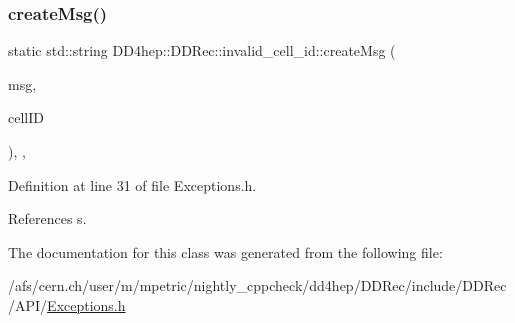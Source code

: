 \subsubsection{\texorpdfstring{create\+Msg()}{createMsg()}}
{\footnotesize\ttfamily static std\+::string D\+D4hep\+::\+D\+D\+Rec\+::invalid\+\_\+cell\+\_\+id\+::create\+Msg (\begin{DoxyParamCaption}\item[{const std\+::string \&}]{msg,  }\item[{const \hyperlink{namespace_d_d4hep_1_1_d_d_segmentation_ac7af071d85cb48820914434a07e21ba1}{D\+D\+Segmentation\+::\+Cell\+ID} \&}]{cell\+ID }\end{DoxyParamCaption})\hspace{0.3cm}{\ttfamily [inline]}, {\ttfamily [static]}, {\ttfamily [private]}}



Definition at line 31 of file Exceptions.\+h.



References s.



The documentation for this class was generated from the following file\+:\begin{DoxyCompactItemize}
\item 
/afs/cern.\+ch/user/m/mpetric/nightly\+\_\+cppcheck/dd4hep/\+D\+D\+Rec/include/\+D\+D\+Rec/\+A\+P\+I/\hyperlink{_d_d_rec_2include_2_d_d_rec_2_a_p_i_2_exceptions_8h}{Exceptions.\+h}\end{DoxyCompactItemize}
